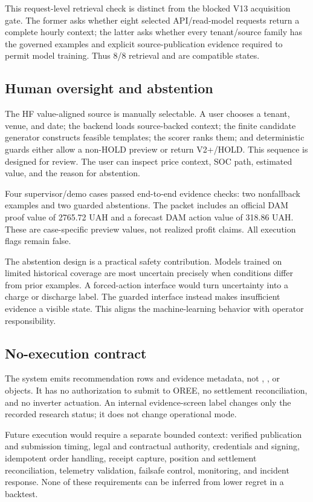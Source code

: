 This request-level retrieval check is distinct from the blocked V13 acquisition
gate. The former asks whether eight selected API/read-model requests return a
complete hourly context; the latter asks whether every tenant/source family has
the governed examples and explicit source-publication evidence required to
permit model training. Thus 8/8 retrieval and 
are compatible states.

\subsection{Human oversight and abstention}

The HF value-aligned source is manually selectable. A user chooses a tenant, venue, and date; the backend loads source-backed context; the finite candidate generator constructs feasible templates; the scorer ranks them; and deterministic guards either allow a non-HOLD preview or return V2+/HOLD. This sequence is designed for review. The user can inspect price context, SOC path, estimated value, and the reason for abstention.

Four supervisor/demo cases passed end-to-end evidence checks: two nonfallback examples and two guarded abstentions. The packet includes an official DAM proof value of 2765.72 UAH and a forecast DAM action value of 318.86 UAH. These are case-specific preview values, not realized profit claims. All execution flags remain false.

The abstention design is a practical safety contribution. Models trained on limited historical coverage are most uncertain precisely when conditions differ from prior examples. A forced-action interface would turn uncertainty into a charge or discharge label. The guarded interface instead makes insufficient evidence a visible state. This aligns the machine-learning behavior with operator responsibility.

\subsection{No-execution contract}

The system emits recommendation rows and evidence metadata, not , , or  objects. It has no authorization to submit to OREE, no settlement reconciliation, and no inverter actuation. An internal evidence-screen label changes only the recorded research status; it does not change operational mode.

Future execution would require a separate bounded context: verified publication and submission timing, legal and contractual authority, credentials and signing, idempotent order handling, receipt capture, position and settlement reconciliation, telemetry validation, failsafe control, monitoring, and incident response. None of these requirements can be inferred from lower regret in a backtest.
